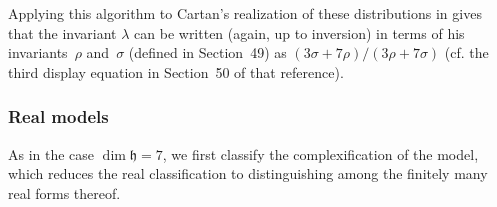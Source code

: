 \documentclass[pdftex]{sigma}
\newcommand{\mfh} {\mathfrak{h}}
\numberwithin{equation}{section}
\begin{document}
Applying this algorithm to Cartan's realization of these distributions in \cite[Section~50]{CartanFiveVariables} gives that the invariant $\lambda$ can be written (again, up to inversion) in terms of his inva\-riants~$\rho$ and~$\sigma$ (defined in Section~49) as $(3 \sigma + 7 \rho) / (3 \rho + 7 \sigma)$ (cf. the third display equation in Section~50 of that reference).

\subsubsection{Real models}\label{subsubsection:identification-6-real}
As in the case $\dim \mfh = 7$, we first classify the complexification of the model, which reduces the real classification to distinguishing among the finitely many real forms thereof.
\end{document}
